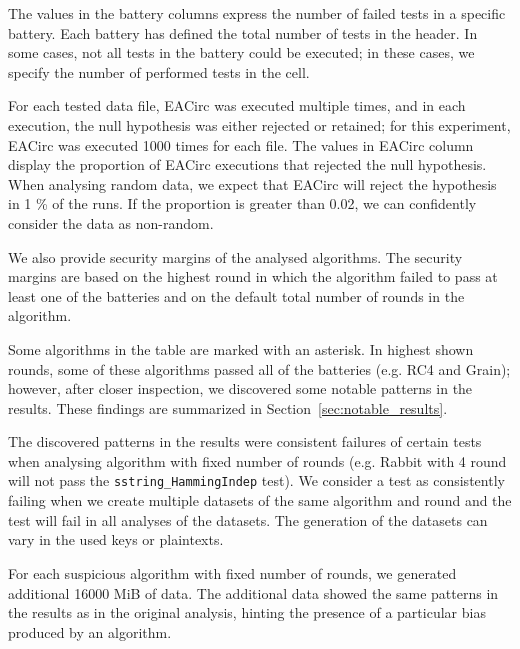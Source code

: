 \documentclass[
	digital,    %
	oneside,    %
	color,
	11pt,
	nocover,
	notable,
	nolof,
	nolot,
]{fithesis3}
\theoremstyle{definition}
\theoremstyle{remark}
\begin{document}
The values in the battery columns express the number of failed tests in a specific battery. Each battery has defined the total number of tests in the header. In some cases, not all tests in the battery could be executed; in these cases, we specify the number of performed tests in the cell. 

For each tested data file, EACirc was executed multiple times, and in each execution, the null hypothesis was either rejected or retained; for this experiment, EACirc was executed 1000 times for each file. The values in EACirc column display the proportion of EACirc executions that rejected the null hypothesis. When analysing random data, we expect that EACirc will reject the hypothesis in 1 \% of the runs. If the proportion is greater than 0.02, we can confidently consider the data as non-random.

We also provide security margins of the analysed algorithms. The security margins are based on the highest round in which the algorithm failed to pass at least one of the batteries and on the default total number of rounds in the algorithm.

Some algorithms in the table are marked with an asterisk. In highest shown rounds, some of these algorithms passed all of the batteries (e.g. RC4 and Grain); however, after closer inspection, we discovered some notable patterns in the results. These findings are summarized in Section~\ref{sec:notable_results}.

The discovered patterns in the results were consistent failures of certain tests when analysing algorithm with fixed number of rounds (e.g. Rabbit with 4 round will not pass the \texttt{sstring\_HammingIndep} test). We consider a test as consistently failing when we create multiple datasets of the same algorithm and round and the test will fail in all analyses of the datasets. The generation of the datasets can vary in the used keys or plaintexts.

For each suspicious algorithm with fixed number of rounds, we generated additional 16000 MiB of data. The additional data showed the same patterns in the results as in the original analysis, hinting the presence of a particular bias produced by an algorithm.
\end{document}

